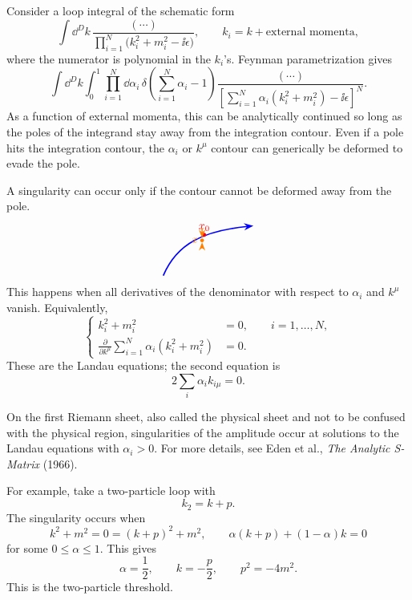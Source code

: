 Consider a loop integral of the schematic form
\[
  \int \dd^D k\,
  \frac{(\cdots)}
  {\prod_{i=1}^N\bigl(k_i^2+m_i^2-\ii\epsilon\bigr)},
  \qquad
  k_i=k+\text{external momenta},
\]
where the numerator is polynomial in the \(k_i\)'s.  Feynman
parametrization gives
\[
  \int \dd^D k
  \int_0^1\prod_{i=1}^N\dd\alpha_i\,
  \delta\!\left(\sum_{i=1}^N\alpha_i-1\right)
  \frac{(\cdots)}
  {\left[
    \sum_{i=1}^N\alpha_i(k_i^2+m_i^2)-\ii\epsilon
  \right]^N}.
\]
As a function of external momenta, this can be analytically continued so
long as the poles of the integrand stay away from the integration
contour.  Even if a pole hits the integration contour, the
\(\alpha_i\) or \(k^\mu\) contour can generically be deformed to evade
the pole.

A singularity can occur only if the contour cannot be deformed away from
the pole.
\[
\begin{tikzpicture}[baseline=-0.55ex,scale=0.86,>=Stealth]
  \draw[blue,line width=1.2pt,->]
    (-1.7,-0.95) .. controls (-1.2,0.25) and (-0.2,0.7) .. (1.6,0.88);
  \fill[red] (-0.2,0.55) circle (2pt) node[above] {\(x_0\)};
  \fill[orange] (-0.28,0.35) circle (2pt) node[left] {\(x\)};
  \draw[orange,->,line width=1pt] (-0.28,0.8) -- (-0.28,0.43);
  \draw[orange,->,line width=1pt] (-0.28,0.05) -- (-0.28,0.28);
\end{tikzpicture}
\]
This happens when all derivatives of the denominator with respect to
\(\alpha_i\) and \(k^\mu\) vanish.  Equivalently,
\[
\left\{
\begin{aligned}
  k_i^2+m_i^2&=0,\qquad i=1,\ldots,N,\\
  \frac{\partial}{\partial k^\mu}
  \sum_{i=1}^N \alpha_i(k_i^2+m_i^2)&=0.
\end{aligned}
\right.
\]
These are the Landau equations; the second equation is
\[
  2\sum_i\alpha_i k_{i\mu}=0.
\]

On the first Riemann sheet, also called the physical sheet and not to be
confused with the physical region, singularities of the amplitude occur
at solutions to the Landau equations with \(\alpha_i>0\).  For more
details, see Eden et al., \emph{The Analytic S-Matrix} (1966).

For example, take a two-particle loop with
\[
  k_2=k+p.
\]
The singularity occurs when
\[
  k^2+m^2=0=(k+p)^2+m^2,
  \qquad
  \alpha(k+p)+(1-\alpha)k=0
\]
for some \(0\leq\alpha\leq1\).  This gives
\[
  \alpha=\frac12,\qquad k=-\frac p2,\qquad p^2=-4m^2.
\]
This is the two-particle threshold.


